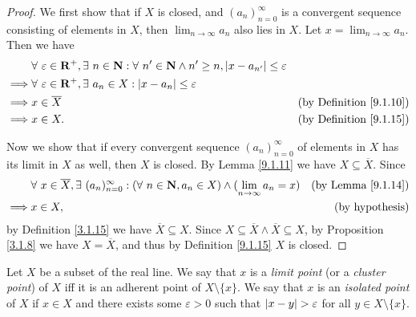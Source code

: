 \begin{proof}
    We first show that if \(X\) is closed, and \((a_n)_{n = 0}^\infty\) is a convergent sequence consisting of elements in \(X\), then \(\lim_{n \to \infty} a_n\) also lies in \(X\).
    Let \(x = \lim_{n \to \infty} a_n\).
    Then we have
    \begin{align*}
                 & \forall\ \varepsilon \in \mathbf{R}^+, \exists\ n \in \mathbf{N} : \forall\ n' \in \mathbf{N} \land n' \geq n, \abs*{x - a_{n'}} \leq \varepsilon                                       \\
        \implies & \forall\ \varepsilon \in \mathbf{R}^+, \exists\ a_n \in X : \abs*{x - a_n} \leq \varepsilon                                                                                             \\
        \implies & x \in \overline{X}                                                                                                                                & \text{(by Definition \ref{9.1.10})} \\
        \implies & x \in X.                                                                                                                                          & \text{(by Definition \ref{9.1.15})}
    \end{align*}

    Now we show that if every convergent sequence \((a_n)_{n = 0}^\infty\) of elements in \(X\) has its limit in \(X\) as well, then \(X\) is closed.
    By Lemma \ref{9.1.11} we have \(X \subseteq \overline{X}\).
    Since
    \begin{align*}
                 & \forall\ x \in \overline{X}, \exists\ (a_n)_{n = 0}^\infty : (\forall\ n \in \mathbf{N}, a_n \in X) \land (\lim_{n \to \infty} a_n = x) & \text{(by Lemma \ref{9.1.14})} \\
        \implies & x \in X,                                                                                                                                & \text{(by hypothesis)}
    \end{align*}
    by Definition \ref{3.1.15} we have \(\overline{X} \subseteq X\).
    Since \(X \subseteq \overline{X} \land \overline{X} \subseteq X\), by Proposition \ref{3.1.8} we have \(X = \overline{X}\), and thus by Definition \ref{9.1.15} \(X\) is closed.
\end{proof}

\begin{definition}\label{9.1.18}
    Let \(X\) be a subset of the real line.
    We say that \(x\) is a \emph{limit point} (or a \emph{cluster point}) of \(X\) iff it is an adherent point of \(X \setminus \{x\}\).
    We say that \(x\) is an \emph{isolated point} of \(X\) if \(x \in X\) and there exists some \(\varepsilon > 0\) such that \(\abs*{x - y} > \varepsilon\) for all \(y \in X \setminus \{x\}\).
\end{definition}

